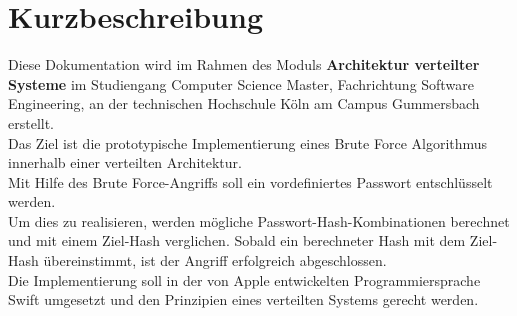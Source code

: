 \chapter*{Kurzbeschreibung}

Diese Dokumentation wird im Rahmen des Moduls \textbf{Architektur verteilter Systeme} im Studiengang Computer Science Master, Fachrichtung Software Engineering, an der technischen Hochschule Köln am Campus Gummersbach erstellt. \\

Das Ziel ist die prototypische Implementierung eines Brute Force Algorithmus innerhalb einer verteilten Architektur.\\
Mit Hilfe des Brute Force-Angriffs soll ein vordefiniertes Passwort entschlüsselt werden. \\
Um dies zu realisieren, werden mögliche Passwort-Hash-Kombinationen berechnet und mit einem Ziel-Hash verglichen. Sobald ein berechneter Hash mit dem Ziel-Hash übereinstimmt, ist der Angriff erfolgreich abgeschlossen. \\

Die Implementierung soll in der von Apple\textsuperscript{\textcopyright} entwickelten Programmiersprache Swift umgesetzt und den Prinzipien eines verteilten Systems gerecht werden.